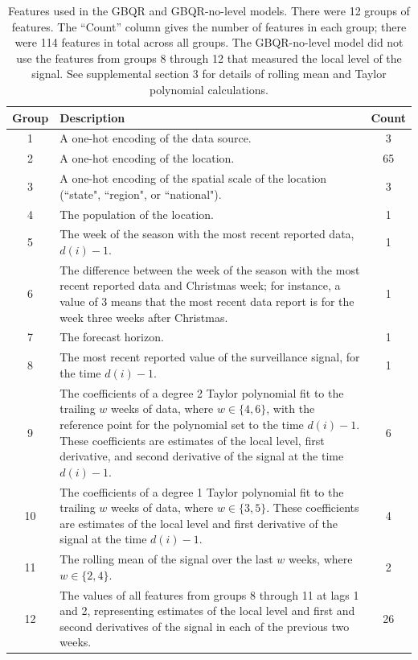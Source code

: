 \documentclass{article}\usepackage[]{graphicx}\usepackage[]{xcolor}
\begin{document}
\begin{table}[htbp]
\centering
\begin{tabular}{cp{11cm}c}
\toprule
Group & \multicolumn{1}{l}{Description} & Count \\
\midrule
1 & A one-hot encoding of the data source. & 3 \\
\midrule
2 & A one-hot encoding of the location. & 65 \\
\midrule
3 & A one-hot encoding of the spatial scale of the location (``state", ``region", or ``national"). & 3 \\
\midrule
4 & The population of the location. & 1 \\
\midrule
5 & The week of the season with the most recent reported data, $d(i) - 1$. & 1 \\
\midrule
6 & The difference between the week of the season with the most recent reported data and Christmas week; for instance, a value of 3 means that the most recent data report is for the week three weeks after Christmas. & 1 \\
\midrule
7 & The forecast horizon. & 1 \\
\midrule
8 & The most recent reported value of the surveillance signal, for the time $d(i) - 1$. & 1 \\
\midrule
9 & The coefficients of a degree 2 Taylor polynomial fit to the trailing $w$ weeks of data, where $w \in \{4, 6\}$, with the reference point for the polynomial set to the time $d(i) - 1$.  These coefficients are estimates of the local level, first derivative, and second derivative of the signal at the time $d(i) - 1$. & 6 \\
\midrule
10 & The coefficients of a degree 1 Taylor polynomial fit to the trailing $w$ weeks of data, where $w \in \{3, 5\}$. These coefficients are estimates of the local level and first derivative of the signal at the time $d(i) - 1$. & 4 \\
\midrule
11 & The rolling mean of the signal over the last $w$ weeks, where $w \in \{2, 4\}$. & 2 \\
\midrule
12 & The values of all features from groups 8 through 11 at lags 1 and 2, representing estimates of the local level and first and second derivatives of the signal in each of the previous two weeks. & 26 \\
\bottomrule
\end{tabular}
\caption{Features used in the GBQR and GBQR-no-level models. There were 12 groups of features. The ``Count'' column gives the number of features in each group; there were 114 features in total across all groups. The GBQR-no-level model did not use the features from groups 8 through 12 that measured the local level of the signal. See supplemental section 3 for details of rolling mean and Taylor polynomial calculations.}
\label{tab:features}
\end{table}
\end{document}
